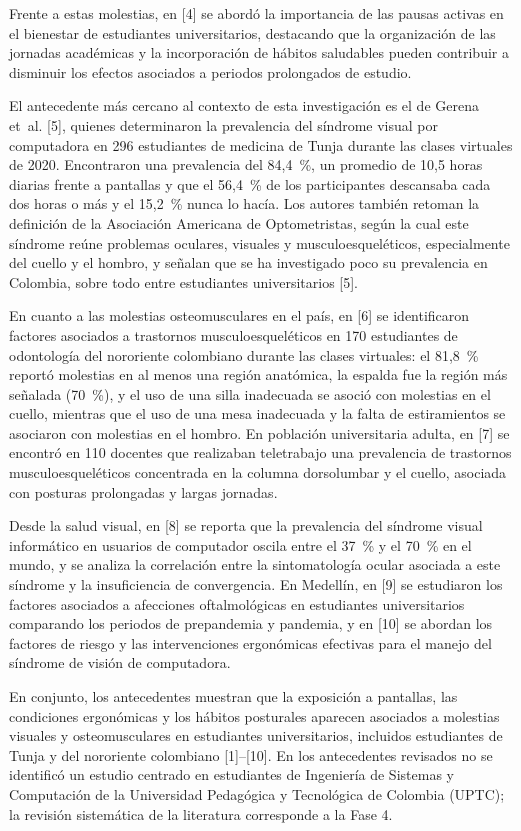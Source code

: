 Frente a estas molestias, en [4] se abordó la importancia de las pausas activas en el
bienestar de estudiantes universitarios, destacando que la organización de las jornadas
académicas y la incorporación de hábitos saludables pueden contribuir a disminuir los
efectos asociados a periodos prolongados de estudio.

El antecedente más cercano al contexto de esta investigación es el de Gerena et~al.
[5], quienes determinaron la prevalencia del síndrome visual por computadora en 296
estudiantes de medicina de Tunja durante las clases virtuales de 2020. Encontraron una
prevalencia del 84,4~\%, un promedio de 10,5 horas diarias frente a pantallas y que el
56,4~\% de los participantes descansaba cada dos horas o más y el 15,2~\% nunca lo
hacía. Los autores también retoman la definición de la Asociación Americana de
Optometristas, según la cual este síndrome reúne problemas oculares, visuales y
musculoesqueléticos, especialmente del cuello y el hombro, y señalan que se ha
investigado poco su prevalencia en Colombia, sobre todo entre estudiantes universitarios
[5].

En cuanto a las molestias osteomusculares en el país, en [6] se identificaron factores
asociados a trastornos musculoesqueléticos en 170 estudiantes de odontología del
nororiente colombiano durante las clases virtuales: el 81,8~\% reportó molestias en al
menos una región anatómica, la espalda fue la región más señalada (70~\%), y el uso de
una silla inadecuada se asoció con molestias en el cuello, mientras que el uso de una
mesa inadecuada y la falta de estiramientos se asociaron con molestias en el hombro.
En población universitaria adulta, en [7] se encontró en 110 docentes que realizaban
teletrabajo una prevalencia de trastornos musculoesqueléticos concentrada en la columna
dorsolumbar y el cuello, asociada con posturas prolongadas y largas jornadas.

Desde la salud visual, en [8] se reporta que la prevalencia del síndrome visual
informático en usuarios de computador oscila entre el 37~\% y el 70~\% en el mundo, y se
analiza la correlación entre la sintomatología ocular asociada a este síndrome y la
insuficiencia de convergencia. En Medellín, en [9] se estudiaron los factores asociados
a afecciones oftalmológicas en estudiantes universitarios comparando los periodos de
prepandemia y pandemia, y en [10] se abordan los factores de riesgo y las intervenciones
ergonómicas efectivas para el manejo del síndrome de visión de computadora.

En conjunto, los antecedentes muestran que la exposición a pantallas, las condiciones
ergonómicas y los hábitos posturales aparecen asociados a molestias visuales y
osteomusculares en estudiantes universitarios, incluidos estudiantes de Tunja y del
nororiente colombiano [1]--[10]. En los antecedentes revisados no se identificó un
estudio centrado en estudiantes de Ingeniería de Sistemas y Computación de la
Universidad Pedagógica y Tecnológica de Colombia (UPTC); la revisión sistemática de la
literatura corresponde a la Fase 4.

